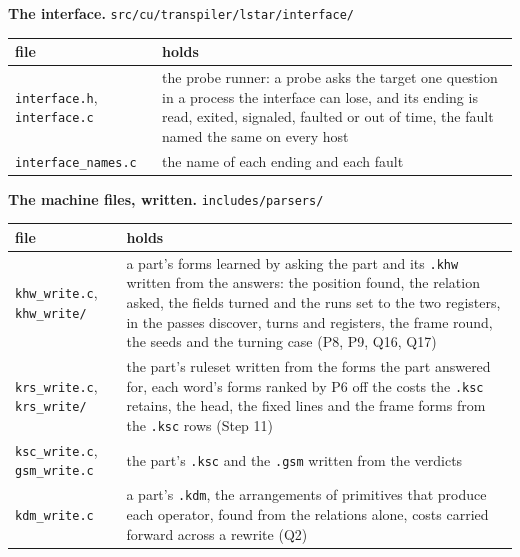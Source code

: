 \textbf{The interface.} \texttt{src/\allowbreak{}cu/\allowbreak{}transpiler/\allowbreak{}lstar/\allowbreak{}interface/\allowbreak{}}

{\small
\setlength{\tabcolsep}{6pt}
\begin{longtable}{>{\RaggedRight\arraybackslash}p{}>{\RaggedRight\arraybackslash}p{}}
\toprule
file & holds \\
\midrule
\endhead
\texttt{interface.\allowbreak{}h}, \texttt{interface.\allowbreak{}c} & the probe runner: a probe asks the target one question in a process the interface can lose, and its ending is read, exited, signaled, faulted or out of time, the fault named the same on every host \\
\texttt{interface\_\allowbreak{}names.\allowbreak{}c} & the name of each ending and each fault \\
\bottomrule
\end{longtable}
}

\textbf{The machine files, written.} \texttt{includes/\allowbreak{}parsers/\allowbreak{}}

{\small
\setlength{\tabcolsep}{6pt}
\begin{longtable}{>{\RaggedRight\arraybackslash}p{}>{\RaggedRight\arraybackslash}p{}}
\toprule
file & holds \\
\midrule
\endhead
\texttt{khw\_\allowbreak{}write.\allowbreak{}c}, \texttt{khw\_\allowbreak{}write/\allowbreak{}} & a part's forms learned by asking the part and its \texttt{.\allowbreak{}khw} written from the answers: the position found, the relation asked, the fields turned and the runs set to the two registers, in the passes discover, turns and registers, the frame round, the seeds and the turning case (P8, P9, Q16, Q17) \\
\texttt{krs\_\allowbreak{}write.\allowbreak{}c}, \texttt{krs\_\allowbreak{}write/\allowbreak{}} & the part's ruleset written from the forms the part answered for, each word's forms ranked by P6 off the costs the \texttt{.\allowbreak{}ksc} retains, the head, the fixed lines and the frame forms from the \texttt{.\allowbreak{}ksc} rows (Step 11) \\
\texttt{ksc\_\allowbreak{}write.\allowbreak{}c}, \texttt{gsm\_\allowbreak{}write.\allowbreak{}c} & the part's \texttt{.\allowbreak{}ksc} and the \texttt{.\allowbreak{}gsm} written from the verdicts \\
\texttt{kdm\_\allowbreak{}write.\allowbreak{}c} & a part's \texttt{.\allowbreak{}kdm}, the arrangements of primitives that produce each operator, found from the relations alone, costs carried forward across a rewrite (Q2) \\
\bottomrule
\end{longtable}
}


